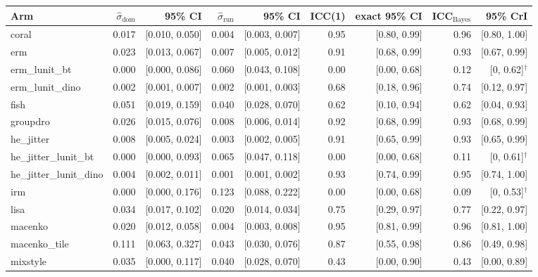 \begin{tabular}{lrrrrrrrr}
\toprule
Arm & $\hat\sigma_\text{dom}$ & 95\% CI & $\hat\sigma_\text{run}$ & 95\% CI & ICC(1) & exact 95\% CI & ICC$_\text{Bayes}$ & 95\% CrI \\
\midrule
coral & 0.017 & [0.010, 0.050] & 0.004 & [0.003, 0.007] & 0.95 & [0.80, 0.99] & 0.96 & [0.80, 1.00] \\
erm & 0.023 & [0.013, 0.067] & 0.007 & [0.005, 0.012] & 0.91 & [0.68, 0.99] & 0.93 & [0.67, 0.99] \\
erm\_lunit\_bt & 0.000 & [0.000, 0.086] & 0.060 & [0.043, 0.108] & 0.00 & [0.00, 0.68] & 0.12 & [0, 0.62]$^\dagger$ \\
erm\_lunit\_dino & 0.002 & [0.001, 0.007] & 0.002 & [0.001, 0.003] & 0.68 & [0.18, 0.96] & 0.74 & [0.12, 0.97] \\
fish & 0.051 & [0.019, 0.159] & 0.040 & [0.028, 0.070] & 0.62 & [0.10, 0.94] & 0.62 & [0.04, 0.93] \\
groupdro & 0.026 & [0.015, 0.076] & 0.008 & [0.006, 0.014] & 0.92 & [0.68, 0.99] & 0.93 & [0.68, 0.99] \\
he\_jitter & 0.008 & [0.005, 0.024] & 0.003 & [0.002, 0.005] & 0.91 & [0.65, 0.99] & 0.93 & [0.65, 0.99] \\
he\_jitter\_lunit\_bt & 0.000 & [0.000, 0.093] & 0.065 & [0.047, 0.118] & 0.00 & [0.00, 0.68] & 0.11 & [0, 0.61]$^\dagger$ \\
he\_jitter\_lunit\_dino & 0.004 & [0.002, 0.011] & 0.001 & [0.001, 0.002] & 0.93 & [0.74, 0.99] & 0.95 & [0.74, 1.00] \\
irm & 0.000 & [0.000, 0.176] & 0.123 & [0.088, 0.222] & 0.00 & [0.00, 0.68] & 0.09 & [0, 0.53]$^\dagger$ \\
lisa & 0.034 & [0.017, 0.102] & 0.020 & [0.014, 0.034] & 0.75 & [0.29, 0.97] & 0.77 & [0.22, 0.97] \\
macenko & 0.020 & [0.012, 0.058] & 0.004 & [0.003, 0.008] & 0.95 & [0.81, 0.99] & 0.96 & [0.81, 1.00] \\
macenko\_tile & 0.111 & [0.063, 0.327] & 0.043 & [0.030, 0.076] & 0.87 & [0.55, 0.98] & 0.86 & [0.49, 0.98] \\
mixstyle & 0.035 & [0.000, 0.117] & 0.040 & [0.028, 0.070] & 0.43 & [0.00, 0.90] & 0.43 & [0.00, 0.89] \\

\end{tabular}
